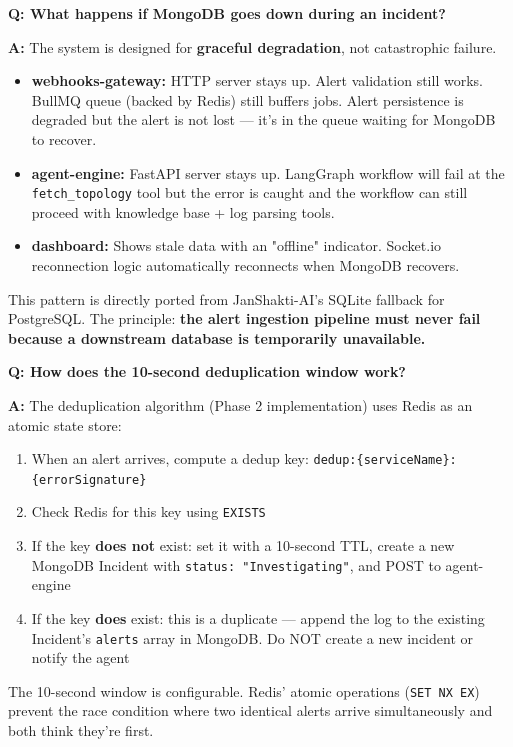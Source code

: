 \documentclass[11pt,a4paper]{article}
\begin{document}
\begin{interviewbox}
\textbf{Q: What happens if MongoDB goes down during an incident?}

\textbf{A:} The system is designed for \textbf{graceful degradation}, not catastrophic failure.

\begin{itemize}[leftmargin=*,itemsep=2pt]
  \item \textbf{webhooks-gateway:} HTTP server stays up. Alert validation still works. BullMQ queue (backed by Redis) still buffers jobs. Alert persistence is degraded but the alert is not lost — it's in the queue waiting for MongoDB to recover.
  \item \textbf{agent-engine:} FastAPI server stays up. LangGraph workflow will fail at the \texttt{fetch\_topology} tool but the error is caught and the workflow can still proceed with knowledge base + log parsing tools.
  \item \textbf{dashboard:} Shows stale data with an "offline" indicator. Socket.io reconnection logic automatically reconnects when MongoDB recovers.
\end{itemize}

This pattern is directly ported from JanShakti-AI's SQLite fallback for PostgreSQL. The
principle: \textbf{the alert ingestion pipeline must never fail because a downstream
database is temporarily unavailable.}
\end{interviewbox}

\begin{interviewbox}
\textbf{Q: How does the 10-second deduplication window work?}

\textbf{A:} The deduplication algorithm (Phase 2 implementation) uses Redis as an atomic state store:

\begin{enumerate}[leftmargin=*,itemsep=2pt]
  \item When an alert arrives, compute a dedup key: \texttt{dedup:\{serviceName\}:\{errorSignature\}}
  \item Check Redis for this key using \texttt{EXISTS}
  \item If the key \textbf{does not} exist: set it with a 10-second TTL, create a new MongoDB Incident with \texttt{status: "Investigating"}, and POST to agent-engine
  \item If the key \textbf{does} exist: this is a duplicate — append the log to the existing Incident's \texttt{alerts} array in MongoDB. Do NOT create a new incident or notify the agent
\end{enumerate}

The 10-second window is configurable. Redis' atomic operations (\texttt{SET NX EX}) prevent the race condition where two identical alerts arrive simultaneously and both think they're first.
\end{interviewbox}
\end{document}
